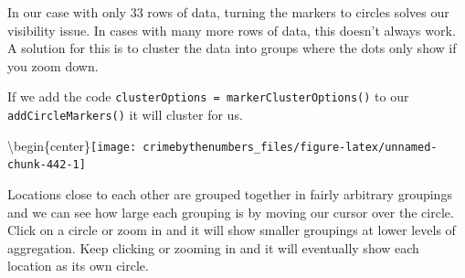 \documentclass[
]{krantz}
\makeatletter
\newenvironment{Shaded}{\begin{snugshade}}{\end{snugshade}}
\newcommand{\AttributeTok}[1]{\textcolor[rgb]{0.61,0.61,0.61}{#1}}
\newcommand{\DecValTok}[1]{\textcolor[rgb]{0.06,0.06,0.06}{#1}}
\newcommand{\FunctionTok}[1]{\textcolor[rgb]{0,0,0}{#1}}
\newcommand{\NormalTok}[1]{#1}
\newcommand{\SpecialCharTok}[1]{\textcolor[rgb]{0,0,0}{#1}}
\newcommand{\StringTok}[1]{\textcolor[rgb]{0.5,0.5,0.5}{#1}}
\newenvironment{kframe}{%
\medskip{}
\setlength{\fboxsep}{.8em}
 \def\at@end@of@kframe{}%
 \ifinner\ifhmode%
  \def\at@end@of@kframe{\end{minipage}}%
  \begin{minipage}{\columnwidth}%
 \fi\fi%
 \def\FrameCommand##1{\hskip\@totalleftmargin \hskip-\fboxsep
 \colorbox{shadecolor}{##1}\hskip-\fboxsep
     \hskip-\linewidth \hskip-\@totalleftmargin \hskip\columnwidth}%
 \MakeFramed {\advance\hsize-\width
   \@totalleftmargin\z@ \linewidth\hsize
   \@setminipage}}%
 {\par\unskip\endMakeFramed%
 \at@end@of@kframe}
\renewenvironment{Shaded}{\begin{kframe}}{\end{kframe}}
\makeatother
\begin{document}
In our case with only 33 rows of data, turning the markers to circles solves our visibility issue. In cases with many more rows of data, this doesn't always work. A solution for this is to cluster the data into groups where the dots only show if you zoom down.

If we add the code \texttt{clusterOptions\ =\ markerClusterOptions()} to our \texttt{addCircleMarkers()} it will cluster for us.

\begin{Shaded}
\end{Shaded}

\textbackslash begin\{center\}\texttt{[image: crimebythenumbers\_files/figure-latex/unnamed-chunk-442-1]}

Locations close to each other are grouped together in fairly arbitrary groupings and we can see how large each grouping is by moving our cursor over the circle. Click on a circle or zoom in and it will show smaller groupings at lower levels of aggregation. Keep clicking or zooming in and it will eventually show each location as its own circle.
\end{document}
